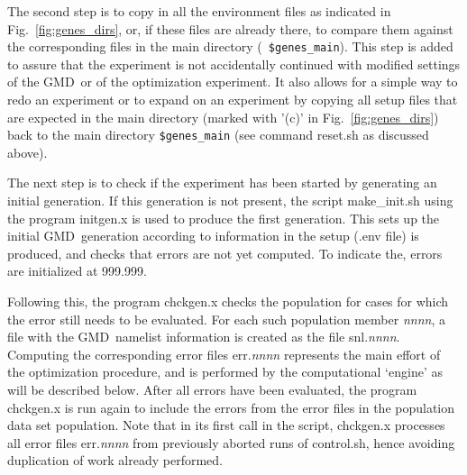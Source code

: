 \documentclass[12pt]{article}
\newcommand{\gmd}{GMD}
\newcommand{\file}{\sf}
\newcommand{\code}{\tt}
\begin{document}
The second step is to copy in all the environment files as indicated in
Fig.~\ref{fig:genes_dirs}, or, if these files are already there, to compare
them against the corresponding files in the main directory ({\code
\$genes\_main}). This step is added to assure that the experiment is not
accidentally continued with modified settings of the \gmd\ or of the
optimization experiment. It also allows for a simple way to redo an experiment
or to expand on an experiment by copying all setup files that are expected in
the main directory (marked with '(c)' in Fig.~\ref{fig:genes_dirs}) back to
the main directory {\code \$genes\_main} (see command {\file reset.sh} as
discussed above).

The next step is to check if the experiment has been started by generating an
initial generation. If this generation is not present, the script {\file
make\_init.sh} using the program {\file initgen.x} is used to produce the
first generation. This sets up the initial \gmd\ generation according to
information in the setup ({\file *.env} file) is produced, and checks that
errors are not yet computed. To indicate the, errors are initialized at
999.999.

Following this, the program {\file chckgen.x} checks the population for cases
for which the error still needs to be evaluated. For each such population
member {\file \it nnnn}, a file with the \gmd\ namelist information is created
as the file {\file snl.{\it nnnn}}. Computing the corresponding error files
{\file err.{\it nnnn}} represents the main effort of the optimization
procedure, and is performed by the computational `engine' as will be described
below. After all errors have been evaluated, the program {\file chckgen.x} is
run again to include the errors from the error files in the population data
set {\file population}. Note that in its first call in the script, {\file
chckgen.x} processes all error files {\file err.{\it nnnn}} from previously
aborted runs of {\file control.sh}, hence avoiding duplication of work already
performed.
\end{document}
